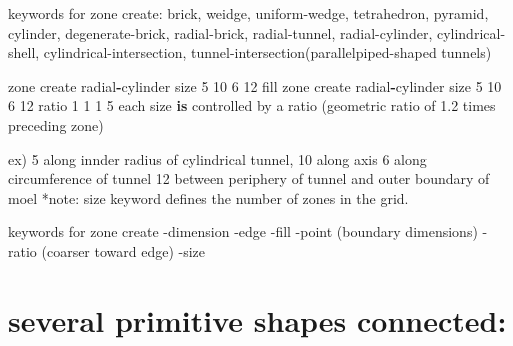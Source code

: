 \documentclass[a4paper, nobind]{templates/ociamthesis}
\newenvironment{Shaded}{\begin{snugshade}}{\end{snugshade}}
\newcommand{\DecValTok}[1]{\textcolor[rgb]{0.00,0.00,0.81}{#1}}
\newcommand{\FloatTok}[1]{\textcolor[rgb]{0.00,0.00,0.81}{#1}}
\newcommand{\KeywordTok}[1]{\textcolor[rgb]{0.13,0.29,0.53}{\textbf{#1}}}
\newcommand{\NormalTok}[1]{#1}
\newcommand{\OperatorTok}[1]{\textcolor[rgb]{0.81,0.36,0.00}{\textbf{#1}}}
\renewenvironment{Shaded}
{
  \vspace{10pt}%
  \begin{snugshade}%
}{%
  \end{snugshade}%
  \vspace{8pt}%
}
\begin{document}
keywords for zone create:
brick, weidge, uniform-wedge, tetrahedron, pyramid, cylinder, degenerate-brick, radial-brick, radial-tunnel, radial-cylinder, cylindrical-shell, cylindrical-intersection, tunnel-intersection(parallelpiped-shaped tunnels)

\begin{Shaded}
\begin{Highlighting}[]
\NormalTok{zone create radial}\OperatorTok{{-}}\NormalTok{cylinder size }\DecValTok{5} \DecValTok{10} \DecValTok{6} \DecValTok{12}\NormalTok{ fill}
\NormalTok{zone create radial}\OperatorTok{{-}}\NormalTok{cylinder size }\DecValTok{5} \DecValTok{10} \DecValTok{6} \DecValTok{12}\NormalTok{ ratio }\DecValTok{1} \DecValTok{1} \DecValTok{1} \DecValTok{5}
\NormalTok{each size }\KeywordTok{is}\NormalTok{ controlled by a ratio (geometric ratio of }\FloatTok{1.2}\NormalTok{ times preceding zone)}
\end{Highlighting}
\end{Shaded}

ex) 5 along innder radius of cylindrical tunnel,
10 along axis
6 along circumference of tunnel
12 between periphery of tunnel and outer boundary of moel
*note: size keyword defines the number of zones in the grid.

keywords for zone create
-dimension
-edge
-fill
-point (boundary dimensions)
-ratio (coarser toward edge)
-size

\hypertarget{several-primitive-shapes-connected}{%
\section{several primitive shapes connected:}\label{several-primitive-shapes-connected}}
\end{document}
